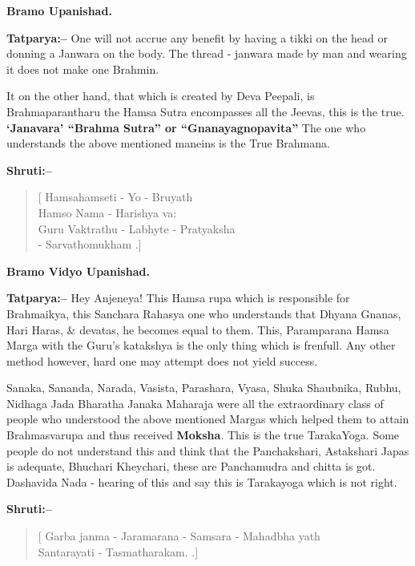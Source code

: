 \begin{flushright}
\textbf{Bramo Upanishad.}
\end{flushright}

\textbf{Tatparya:–} One will not accrue any benefit by having a tikki on the head or donning a Janwara on the body. The thread - janwara made by man and wearing it does not make one Brahmin.

It on the other hand, that which is created by Deva Peepali, is Brahmaparantharu the Hamsa Sutra encompasses all the Jeevas, this is the true. \textbf{‘Janavara’ “Brahma Sutra” or “Gnanayagnopavita”} The one who understands the above mentioned maneins is the True Brahmana.

\textbf{Shruti:–}

\begin{verse}
[ Hamsahamseti - Yo - Bruyath \\ Hamso Nama - Harishya va: \\ Guru Vaktrathu - Labhyte - Pratyaksha\\ - Sarvathomukham .]
\end{verse}

\begin{flushright}
\textbf{Bramo Vidyo Upanishad.}
\end{flushright}

\textbf{Tatparya:–} Hey Anjeneya! This Hamsa rupa which is responsible for Brahmaikya, this Sanchara Rahasya one who understands that Dhyana Gnanas, Hari Haras, \& devatas, he becomes equal to them. This, Paramparana Hamsa Marga with the Guru's katakshya is the only thing which is frenfull. Any other method however, hard one may attempt does not yield success.

Sanaka, Sananda, Narada, Vasista, Parashara, Vyasa, Shuka Shaubnika, Rubhu, Nidhaga Jada Bharatha Janaka Maharaja were all the extraordinary class of people who understood the above mentioned Margas which helped them to attain Brahmasvarupa and thus received \textbf{Moksha}. This is the true TarakaYoga. Some people do not understand this and think that the Panchakshari, Astakshari Japas is adequate, Bhuchari Kheychari, these are Panchamudra and chitta is got. Dashavida Nada - hearing of this and say this is Tarakayoga which is not right.

\textbf{Shruti:–}

\begin{verse}
[ Garba janma - Jaramarana - Samsara - Mahadbha yath \\ Santarayati - Tasmatharakam. .]
\end{verse}

